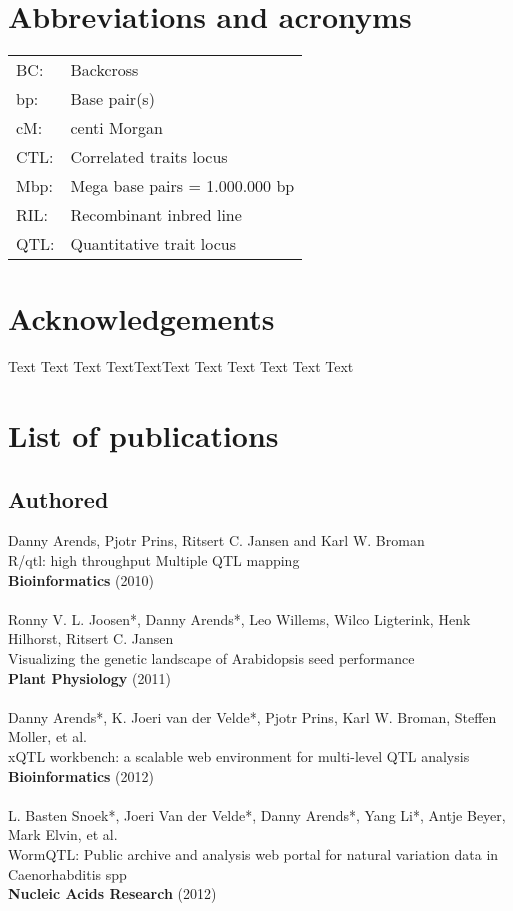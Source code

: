 \documentclass[10pt, oneside, a5paper]{report}
\newcommand{\authors}[1]{\small{#1}}
\newcommand{\bold}[1]{{\bfseries #1}}
\begin{document}
\section*{Abbreviations and acronyms}
\begin{tabular}{ l l }
BC:          & Backcross \\
bp:          & Base pair(s) \\
cM:          & centi Morgan \\
CTL:         & Correlated traits locus \\
Mbp:         & Mega base pairs = 1.000.000 bp \\
RIL:         & Recombinant inbred line \\
QTL:         & Quantitative trait locus \\
\end{tabular}

\section*{Acknowledgements}
Text Text Text TextTextText Text Text Text Text Text

\section*{List of publications}
\subsection*{Authored}
  \authors{Danny Arends, Pjotr Prins, Ritsert C. Jansen and Karl W. Broman}\\
  R/qtl: high throughput Multiple QTL mapping\\
  \bold{Bioinformatics} (2010)\\\\
  \authors{Ronny V. L. Joosen*, Danny Arends*, Leo Willems, Wilco Ligterink, Henk Hilhorst, Ritsert C. Jansen}\\
  Visualizing the genetic landscape of Arabidopsis seed performance\\
  \bold{Plant Physiology} (2011)\\\\
  \authors{Danny Arends*, K. Joeri van der Velde*, Pjotr Prins, Karl W. Broman, Steffen Moller, et al.}\\
  xQTL workbench: a scalable web environment for multi-level QTL analysis\\
  \bold{Bioinformatics} (2012)\\\\
  \authors{L. Basten Snoek*, Joeri Van der Velde*, Danny Arends*, Yang Li*, Antje Beyer, Mark Elvin, et al.}\\
  WormQTL: Public archive and analysis web portal for natural variation data in Caenorhabditis spp\\
  \bold{Nucleic Acids Research} (2012)
\end{document}

